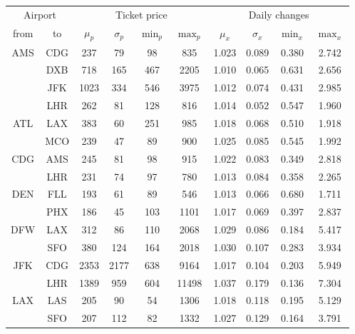 \begin{table}
\centering
\footnotesize
\begin{tabular}{c c | c c c c | c c c c}
\toprule
\multicolumn{2}{c|}{Airport}  & \multicolumn{4}{c|}{Ticket price} & \multicolumn{4}{c}{Daily changes} \\[.4ex]
from & to    &  $\mu_{p}$ & $\sigma_{p}$  &  $\min_p$  & $\max_p$  & $\mu_x$ & $\sigma_x$  & $\min_x$  &  $\max_x$ \\
\midrule

AMS  &  CDG  &   237  &    79  &    98  &   835  &  1.023  &  0.089  &  0.380  &  2.742  \\
~    &  DXB  &   718  &   165  &   467  &  2205  &  1.010  &  0.065  &  0.631  &  2.656  \\
~    &  JFK  &  1023  &   334  &   546  &  3975  &  1.012  &  0.074  &  0.431  &  2.985  \\
~    &  LHR  &   262  &    81  &   128  &   816  &  1.014  &  0.052  &  0.547  &  1.960  \\[.5ex]
ATL  &  LAX  &   383  &    60  &   251  &   985  &  1.018  &  0.068  &  0.510  &  1.918  \\
~    &  MCO  &   239  &    47  &    89  &   900  &  1.025  &  0.085  &  0.545  &  1.992  \\[.5ex]
CDG  &  AMS  &   245  &    81  &    98  &   915  &  1.022  &  0.083  &  0.349  &  2.818  \\
~    &  LHR  &   231  &    74  &    97  &   780  &  1.013  &  0.084  &  0.358  &  2.265  \\[.5ex]
DEN  &  FLL  &   193  &    61  &    89  &   546  &  1.013  &  0.066  &  0.680  &  1.711  \\
~    &  PHX  &   186  &    45  &   103  &  1101  &  1.017  &  0.069  &  0.397  &  2.837  \\[.5ex]
DFW  &  LAX  &   312  &    86  &   110  &  2068  &  1.029  &  0.086  &  0.184  &  5.417  \\
~    &  SFO  &   380  &   124  &   164  &  2018  &  1.030  &  0.107  &  0.283  &  3.934  \\[.5ex]
JFK  &  CDG  &  2353  &  2177  &   638  &  9164  &  1.017  &  0.104  &  0.203  &  5.949  \\
~    &  LHR  &  1389  &   959  &   604  &  11498  &  1.037  &  0.179  &  0.136  &  7.304  \\[.5ex]
LAX  &  LAS  &   205  &    90  &    54  &  1306  &  1.018  &  0.118  &  0.195  &  5.129  \\
~    &  SFO  &   207  &   112  &    82  &  1332  &  1.027  &  0.129  &  0.164  &  3.791  \\[.5ex]

\end{tabular}
\end{table}
